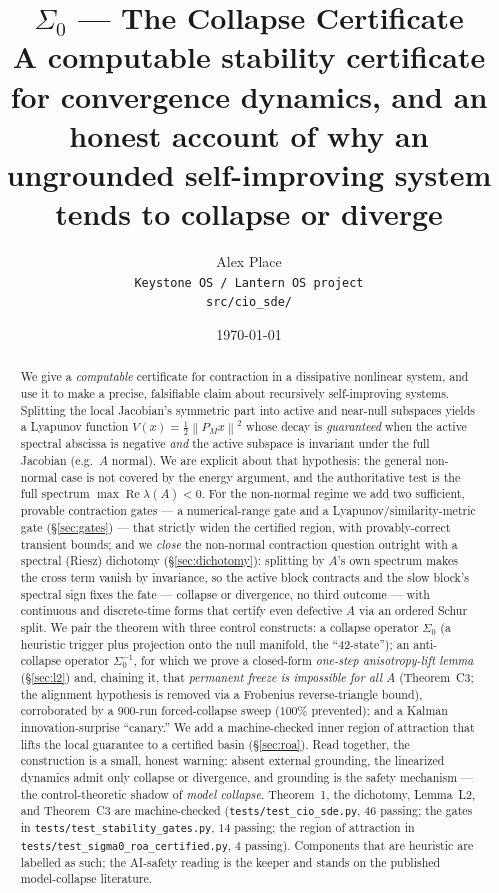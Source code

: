 \documentclass[11pt]{article}
\title{\textbf{$\Sigma_0$ --- The Collapse Certificate}\\[4pt]
\large A computable stability certificate for convergence dynamics, and an honest
account of why an ungrounded self-improving system tends to collapse or diverge}
\author{Alex Place\\ \texttt{Keystone OS / Lantern OS project}\\ \small\texttt{src/cio\_sde/}}
\date{\today}
\theoremstyle{definition}
\newcommand{\norm}[1]{\left\lVert#1\right\rVert}
\newcommand{\Szero}{\Sigma_0}
\newcommand{\PM}{P_{\!M}}
\DeclareMathOperator*{\Real}{Re}
\begin{document}
\maketitle

\begin{abstract}
We give a \emph{computable} certificate for contraction in a dissipative nonlinear
system, and use it to make a precise, falsifiable claim about recursively
self-improving systems. Splitting the local Jacobian's symmetric part into active and
near-null subspaces yields a Lyapunov function $V(x)=\tfrac12\norm{\PM x}^2$ whose decay
is \emph{guaranteed} when the active spectral abscissa is negative \emph{and} the active
subspace is invariant under the full Jacobian (e.g.\ $A$ normal). We are explicit about
that hypothesis: the general non-normal case is not covered by the energy argument, and
the authoritative test is the full spectrum $\max\Real\lambda(A)<0$. For the non-normal
regime we add two sufficient, provable contraction gates --- a numerical-range gate and a
Lyapunov/similarity-metric gate (\S\ref{sec:gates}) --- that strictly widen the certified
region, with provably-correct transient bounds; and we \emph{close} the non-normal
contraction question outright with a spectral (Riesz) dichotomy (\S\ref{sec:dichotomy}):
splitting by $A$'s own spectrum makes the cross term vanish by invariance, so the active
block contracts and the slow block's spectral sign fixes the fate --- collapse or divergence,
no third outcome --- with continuous and discrete-time forms that certify even defective
$A$ via an ordered Schur split. We pair the theorem with three control
constructs: a collapse operator $\Szero$ (a heuristic trigger plus projection onto the
null manifold, the ``42-state''); an anti-collapse operator $\Sigma_0^{-1}$, for which we
prove a closed-form \emph{one-step anisotropy-lift lemma} (\S\ref{sec:l2}) and, chaining it,
that \emph{permanent freeze is impossible for all $A$} (Theorem~C3; the alignment hypothesis
is removed via a Frobenius reverse-triangle bound), corroborated by a $900$-run
forced-collapse sweep ($100\%$ prevented); and a Kalman innovation-surprise
``canary.'' We add a machine-checked inner region of attraction that lifts the local
guarantee to a certified basin (\S\ref{sec:roa}). Read together, the construction is a
small, honest warning: absent external
grounding, the linearized dynamics admit only collapse or divergence, and grounding is the
safety mechanism --- the control-theoretic shadow of \emph{model collapse}. Theorem~1, the
dichotomy, Lemma~L2, and Theorem~C3 are machine-checked (\texttt{tests/test\_cio\_sde.py},
$46$ passing; the gates in \texttt{tests/test\_stability\_gates.py}, $14$ passing; the
region of attraction in \texttt{tests/test\_sigma0\_roa\_certified.py}, $4$ passing).
Components that are heuristic are
labelled as such; the AI-safety reading is the keeper and stands on the published
model-collapse literature.
\end{abstract}
\end{document}
